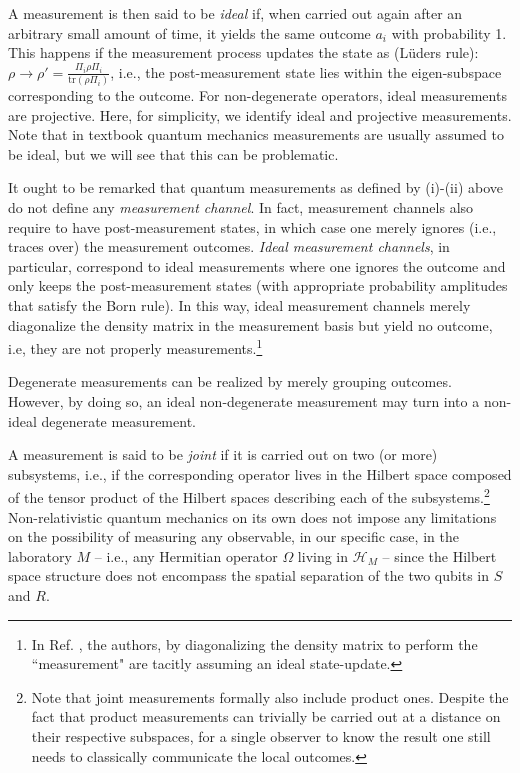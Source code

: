 \documentclass[a4paper,twocolumn,11pt,accepted=2024-02-14]{quantumarticle}
\begin{document}
A measurement is then said to be \textit{ideal} if, when carried out again after an arbitrary small amount of time, it yields the same outcome $a_i$ with probability 1. This happens if the measurement process updates the state as (L\"uders rule): $\rho \rightarrow \rho'= \frac{\Pi_i \rho \Pi_i}{\text{tr} (\rho \Pi_i)}$, i.e., the post-measurement state lies within the eigen-subspace corresponding to the outcome. For non-degenerate operators, ideal measurements are projective. Here, for simplicity, we identify ideal and projective measurements. Note that in textbook quantum mechanics measurements are usually assumed to be ideal, but we will see that this can be problematic. 

It ought to be remarked that quantum measurements as defined by (i)-(ii) above do not define any \textit{measurement channel}. In fact, measurement channels also require to have post-measurement states, in which case one merely ignores (i.e., traces over) the measurement outcomes. \textit{Ideal measurement channels}, in particular,  correspond to ideal measurements where one ignores the outcome and only keeps the post-measurement states (with appropriate probability amplitudes that satisfy the Born rule). In this way, ideal measurement channels merely diagonalize the density matrix in the measurement basis but yield no outcome, i.e, they are not properly measurements.\footnote{In Ref. \cite{beckman2001causal}, the authors, by diagonalizing the density matrix to perform the ``measurement" are tacitly assuming an ideal state-update.}

Degenerate measurements can be realized by merely grouping outcomes. However, by doing so, an ideal non-degenerate measurement may turn into a non-ideal degenerate measurement.

A  measurement is said to be \textit{joint} if it is carried out on two (or more) subsystems, i.e., if the corresponding operator lives in the Hilbert space composed of the tensor product of the Hilbert spaces describing each of the subsystems.\footnote{Note that joint measurements formally also include product ones. Despite the fact that product measurements can trivially be carried out at a distance on their respective subspaces, for a single observer to know the result one still needs to classically communicate the local outcomes.} 
Non-relativistic quantum mechanics on its own does not impose any limitations on the possibility of measuring any observable, in our specific case, in the laboratory $M$ -- i.e., any Hermitian operator $\Omega$ living in $\mathcal{H}_M$ -- since the Hilbert space structure does not encompass the spatial  separation of the two qubits in $S$ and $R$.
\end{document}
